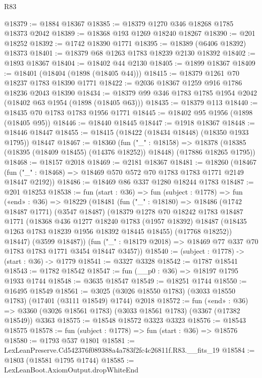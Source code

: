 \begin{lexlean}{R83}
\begin{coremodule}
@18379 := @1884 @18367
@18385 := @18379 @1270 @346 @18268 @1785 @18373 @2042
@18389 := @18368 @193 @1269 @18240 @18267
@18390 := @201 @18252
@18392 := @1742 @18390 @1771
@18395 := @18389 (@6406 @18392) @18373
@18401 := @18379 @68 @1263 @1783 @18239 @2130 @18392
@18402 := @1893 @18367
@18404 := @18402 @44 @2130
@18405 := @1899 @18367
@18409 := @18401 (@18404 (@1898 (@18405 @44)))
@18415 := @18379 @1261 @70 @18237 @1783 @18390 @1771
@18422 := @2036 @18367 @1259 @916 @1786 @18236 @2043 @18390
@18434 := @18379 @99 @346 @1783 @1785 @1954 @2042 (@18402 @63 @1954 (@1898 (@18405 @63)))
@18435 := @18379 @113
@18440 := @18435 @70 @1783 @1783 @1956 @1771
@18445 := @18402 @95 @1956 (@1898 (@18405 @95))
@18446 := @18440 @18445
@18447 := @1918 @18367
@18448 := @18446 @18447
@18455 := @18415 (@18422 (@18434 @18448) (@18350 @1933 @1795)) @18447
@18467 := @18360
    (fun ("_" : @18158) =>
    @18378 (@18385 (@18395 (@18409 @18455) (@14376 @18252)) @18448) (@17886 @18265 @1795))
@18468 := @18157 @2018
@18469 := @2181 @18367
@18481 := @18260
    (@18467 (fun ("_" : @18468) => @18469 @570 @572 @70 @1783 @1783 @1771 @2149 @18447 @2192))
@18486 := @18469 @86 @337 @1280 @18244 @1783
@18487 := @201 @18253
@18538 := fun (start : @36) =>
  fun (subject : @1778) =>
  fun («end» : @36) =>
  @18229
    (@18481
      (fun ("_" : @18180) =>
      @18486
        (@1742 @18487 @1771)
        (@3547 @18487)
        (@18379
          @1278
          @70
          @18242
          @1783
          @18487
          @1771
          (@18368
            @436
            @1277
            @18240
            @1783
            (@1957 @18392)
            @18487
            (@18435 @1263 @1783 @18239 @1956 @18392 @18445 @18455)
            (@17768 @18252))
          @18447)
        (@3599 @18487))
      (fun ("_" : @18179 @2018) => @18469 @77 @337 @70 @1783 @1783 @1771 @3454 @18447 @3457))
@18540 := (subject : @1778) -> (start : @36) -> @1779
@18541 := @3327 @3328
@18542 := @1787 @18541
@18543 := @1782 @18542
@18547 := fun (__p0 : @36) => @18197 @1795 @1933 @1744
@18548 := @3635 @18547
@18549 := @18251 @1744
@18550 := @16495 @18549
@18561 := @3025 (@3026 @18550 @1783) (@3033 @18550 @1783) (@17401 (@3111 @18549) @1744) @2018
@18572 := fun («end» : @36) =>
  @3360 (@3026 @18561 @1783) (@3033 @18561 @1783) (@3367 (@17382 @18549)) @3363
@18575 := @18548 @18572 @3323 @3323
@18576 := @18543 @18575
@18578 := fun (subject : @1778) => fun (start : @36) => @18576
@18580 := @1793 @537 @1801
@18581 := LexLeanPreserve.Cd542376f089388a4a783f2fc4c26811f.R83.__fits_19
@18584 := @1803 (@18581 @1795 @1744)
@18585 := LexLeanBoot.AxiomOutput.dropWhiteEnd

\end{coremodule}
\end{lexlean}
